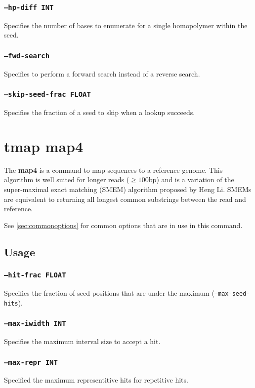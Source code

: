 \documentclass[a4paper,12pt]{book}
\newcommand{\TT}[1]{{\tt #1}} %
\newcommand{\BF}[1]{{\bf #1}} %
\begin{document}
\subsubsection{\TT{--hp-diff INT}}
Specifies the number of bases to enumerate for a single homopolymer within the seed.

\subsubsection{\TT{--fwd-search}}
Specifies to perform a forward search instead of a reverse search.

\subsubsection{\TT{--skip-seed-frac FLOAT}}
Specifies the fraction of a seed to skip when a lookup succeeds.

\section{tmap map4}
\label{sec:map4}
The \BF{map4} is a command to map sequences to a reference genome.
This algorithm is well suited for longer reads ($\geq 100$bp) and is a variation of the super-maximal exact matching (SMEM) algorithm proposed by Heng Li.
SMEMs are equivalent to returning all longest common substrings between the read and reference.

See \autoref{sec:commonoptions} for common options that are in use in this command.

\subsection{Usage}

\subsubsection{\TT{--hit-frac FLOAT}}
Specifies the fraction of seed positions that are under the maximum (\TT{--max-seed-hits}).

\subsubsection{\TT{--max-iwidth INT}}
Specifies the maximum interval size to accept a hit.

\subsubsection{\TT{--max-repr INT}}
Specified the maximum representitive hits for repetitive hits.
\end{document}
